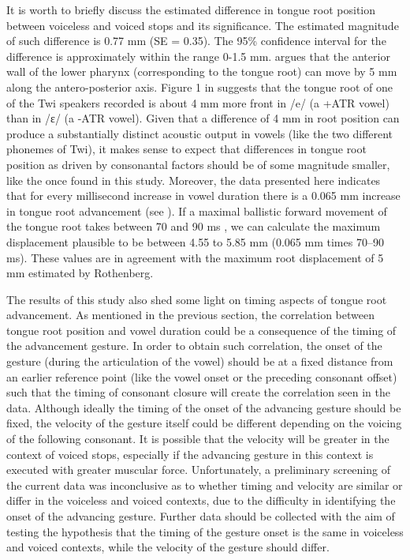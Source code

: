 \documentclass[
  12pt,
]{article}
\begin{document}
It is worth to briefly discuss the estimated difference in tongue root
position between voiceless and voiced stops and its significance. The
estimated magnitude of such difference is 0.77 mm (SE = 0.35). The 95\%
confidence interval for the difference is approximately within the range
0-1.5 mm. \citet{rothenberg1967} argues that the anterior wall of the
lower pharynx (corresponding to the tongue root) can move by 5 mm along
the antero-posterior axis. Figure 1 in \citet{kirkham2017} suggests that
the tongue root of one of the Twi speakers recorded is about 4 mm more
front in /e/ (a +ATR vowel) than in /ɛ/ (a -ATR vowel). Given that a
difference of 4 mm in root position can produce a substantially distinct
acoustic output in vowels (like the two different phonemes of Twi), it
makes sense to expect that differences in tongue root position as driven
by consonantal factors should be of some magnitude smaller, like the
once found in this study. Moreover, the data presented here indicates
that for every millisecond increase in vowel duration there is a 0.065
mm increase in tongue root advancement (see ). If a
maximal ballistic forward movement of the tongue root takes between 70
and 90 ms \citep{rothenberg1967}, we can calculate the maximum
displacement plausible to be between 4.55 to 5.85 mm (0.065 mm times
70--90 ms). These values are in agreement with the maximum root
displacement of 5 mm estimated by Rothenberg.

The results of this study also shed some light on timing aspects of
tongue root advancement. As mentioned in the previous section, the
correlation between tongue root position and vowel duration could be a
consequence of the timing of the advancement gesture. In order to obtain
such correlation, the onset of the gesture (during the articulation of
the vowel) should be at a fixed distance from an earlier reference point
(like the vowel onset or the preceding consonant offset) such that the
timing of consonant closure will create the correlation seen in the
data. Although ideally the timing of the onset of the advancing gesture
should be fixed, the velocity of the gesture itself could be different
depending on the voicing of the following consonant. It is possible that
the velocity will be greater in the context of voiced stops, especially
if the advancing gesture in this context is executed with greater
muscular force. Unfortunately, a preliminary screening of the current
data was inconclusive as to whether timing and velocity are similar or
differ in the voiceless and voiced contexts, due to the difficulty in
identifying the onset of the advancing gesture. Further data should be
collected with the aim of testing the hypothesis that the timing of the
gesture onset is the same in voiceless and voiced contexts, while the
velocity of the gesture should differ.
\end{document}
